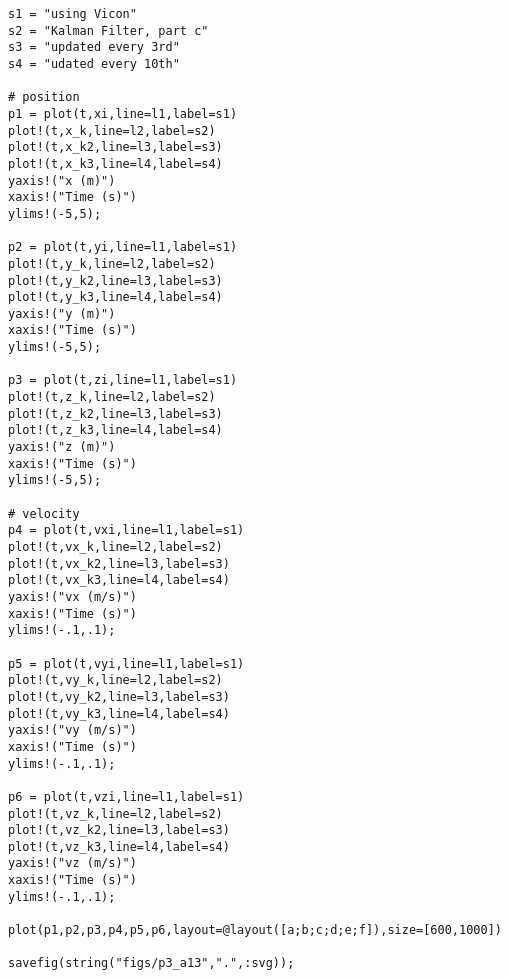 \documentclass[paper=a4, fontsize=11pt]{scrartcl}
\numberwithin{equation}{section}		%
\numberwithin{figure}{section}			%
\numberwithin{table}{section}				%
\begin{document}
\begin{lstlisting}
s1 = "using Vicon"
s2 = "Kalman Filter, part c"
s3 = "updated every 3rd"
s4 = "udated every 10th"

# position
p1 = plot(t,xi,line=l1,label=s1)
plot!(t,x_k,line=l2,label=s2)
plot!(t,x_k2,line=l3,label=s3)
plot!(t,x_k3,line=l4,label=s4)
yaxis!("x (m)")
xaxis!("Time (s)")
ylims!(-5,5);

p2 = plot(t,yi,line=l1,label=s1)
plot!(t,y_k,line=l2,label=s2)
plot!(t,y_k2,line=l3,label=s3)
plot!(t,y_k3,line=l4,label=s4)
yaxis!("y (m)")
xaxis!("Time (s)")
ylims!(-5,5);

p3 = plot(t,zi,line=l1,label=s1)
plot!(t,z_k,line=l2,label=s2)
plot!(t,z_k2,line=l3,label=s3)
plot!(t,z_k3,line=l4,label=s4)
yaxis!("z (m)")
xaxis!("Time (s)")
ylims!(-5,5);

# velocity
p4 = plot(t,vxi,line=l1,label=s1)
plot!(t,vx_k,line=l2,label=s2)
plot!(t,vx_k2,line=l3,label=s3)
plot!(t,vx_k3,line=l4,label=s4)
yaxis!("vx (m/s)")
xaxis!("Time (s)")
ylims!(-.1,.1);

p5 = plot(t,vyi,line=l1,label=s1)
plot!(t,vy_k,line=l2,label=s2)
plot!(t,vy_k2,line=l3,label=s3)
plot!(t,vy_k3,line=l4,label=s4)
yaxis!("vy (m/s)")
xaxis!("Time (s)")
ylims!(-.1,.1);

p6 = plot(t,vzi,line=l1,label=s1)
plot!(t,vz_k,line=l2,label=s2)
plot!(t,vz_k2,line=l3,label=s3)
plot!(t,vz_k3,line=l4,label=s4)
yaxis!("vz (m/s)")
xaxis!("Time (s)")
ylims!(-.1,.1);

plot(p1,p2,p3,p4,p5,p6,layout=@layout([a;b;c;d;e;f]),size=[600,1000])

savefig(string("figs/p3_a13",".",:svg));

\end{lstlisting}
\end{document}
